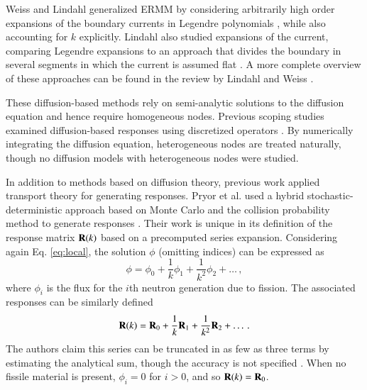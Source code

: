 Weiss and Lindahl generalized ERMM by considering arbitrarily 
high order expansions of the boundary currents in Legendre 
polynomials \cite{weiss1975hor}, while also accounting for $k$ explicitly.
Lindahl also studied expansions of the current, comparing Legendre 
expansions to an approach that divides the boundary in several segments 
in which the current is assumed flat \cite{lindahl1976mdr}.  A more
complete overview of these approaches can be found in the review by Lindahl
and Weiss \cite{lindahl1981rrm}.

These diffusion-based methods rely on semi-analytic solutions to the 
diffusion equation and hence require homogeneous nodes. Previous 
scoping studies examined diffusion-based responses using discretized 
operators \cite{roberts2011ser}.  By numerically integrating the diffusion 
equation, heterogeneous nodes are treated naturally, though no diffusion 
models with heterogeneous nodes were studied.


In addition to methods based on diffusion theory, previous work applied 
transport theory for generating responses. Pryor et al. used 
a hybrid stochastic-deterministic approach based on
Monte Carlo and the collision probability 
method to generate responses \cite{pryor1973rmm, pryor1975rdr,
sicilian1975atr}.  Their work is unique in its definition
of the response matrix $\mathbf{R}(k)$ based on a precomputed 
series expansion.  Considering again Eq. \ref{eq:local}, the 
solution $\phi$ (omitting 
indices) can
be expressed as
\begin{equation}
 \phi = \phi_{0} + \frac{1}{k}\phi_{1}
                 + \frac{1}{k^2}\phi_{2}  + \ldots \, ,
\end{equation}
where $\phi_{i} $ is the flux for the $i$th neutron
generation due to fission.  The 
associated responses can be similarly defined
\begin{equation}
 \mathbf{R}(k) = \mathbf{R}_0 + \frac{1}{k}\mathbf{R}_1
                 + \frac{1}{k^2}\mathbf{R}_2  + \ldots \, .
\label{eq:responsesum}
\end{equation}
The authors claim this series can be truncated in as few as three terms 
by estimating the analytical sum, though the accuracy is not 
specified \cite{sicilian1975atr}.  When no fissile material is present, 
$\phi_{i} = 0$ for $i > 0$, and so $\mathbf{R}(k) = \mathbf{R}_0$.


